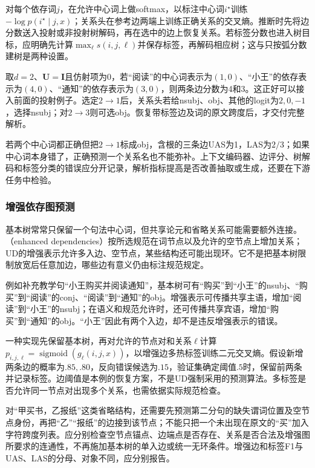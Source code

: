 对每个依存词$j$，在允许中心词上做softmax，以标注中心词$i^\star$训练$-\log p(i^\star\mid j,x)$；关系头在参考边两端上训练正确关系的交叉熵。推断时先将边分数送入投射或非投射树解码，再在选中的边上恢复关系。若标签分数也进入树目标，应明确先计算$\max_\ell s(i,j,\ell)$并保存标签，再解码相应树；这与只按弧分数建树是两种设置。

取$d=2$、$\bm U=\bm I$且仿射项为0，若“阅读”的中心词表示为$(1,0)$、“小王”的依存表示为$(4,0)$、“通知”的依存表示为$(3,0)$，则两条边分数为4和3。这正好可以接入前面的投射例子。选定$2\to1$后，关系头若给nsubj、obj、其他的logit为$2,0,-1$，选择nsubj；对$2\to3$则可选obj。恢复带标签边及词的原文跨度后，才交付完整解析。

若两个中心词都正确但把$2\to1$标成obj，含根的三条边UAS为1，LAS为$2/3$；如果中心词本身错了，正确预测一个关系名也不能弥补。上下文编码器、边评分、树解码和标签分类的错误应分开记录，解析指标提高是否改善抽取或生成，还要在下游任务中检验。

\subsubsection{增强依存图预测}
\label{sec:nlp-analysis-enhanced}

基本树常常只保留一个句法中心词，但共享论元和省略关系可能需要额外连接。（enhanced dependencies）按所选规范在词节点以及允许的空节点上增加关系；UD的增强表示允许多入边、空节点，某些结构还可能出现环。它不是把基本树限制放宽后任意加边，哪些边有意义仍由标注规范规定。

例如补充教学句“小王购买并阅读通知”，基本树可有“购买”到“小王”的nsubj、“购买”到“阅读”的conj、“阅读”到“通知”的obj。增强表示可传播共享主语，增加“阅读”到“小王”的nsubj；在语义和规范允许时，还可传播共享宾语，增加“购买”到“通知”的obj。“小王”因此有两个入边，却不是违反增强表示的错误。

一种实现先保留基本树，再对允许的节点对和关系$\ell$计算
$p_{i,j,\ell}=\operatorname{sigmoid}(g_\ell(i,j,x))$，以增强边多热标签训练二元交叉熵。假设新增两条边的概率为$.85,.80$，反向错误候选为$.15$，验证集确定阈值$.5$时，保留前两条并记录标签。边阈值是本例的恢复方案，不是UD强制采用的预测算法。多标签是否允许同一节点对出现多个关系，也需依据实际规范检查。

对“甲买书，乙报纸”这类省略结构，还需要先预测第二分句的缺失谓词位置及空节点身份，再把“乙”“报纸”的边接到该节点；不能只把一个未出现在原文的“买”加入字符跨度列表。应分别检查空节点锚点、边端点是否存在、关系是否合法及增强图所要求的连通性，不再施加基本树的单入边或统一无环条件。增强边和标签F1与UAS、LAS的分母、对象不同，应分别报告。

